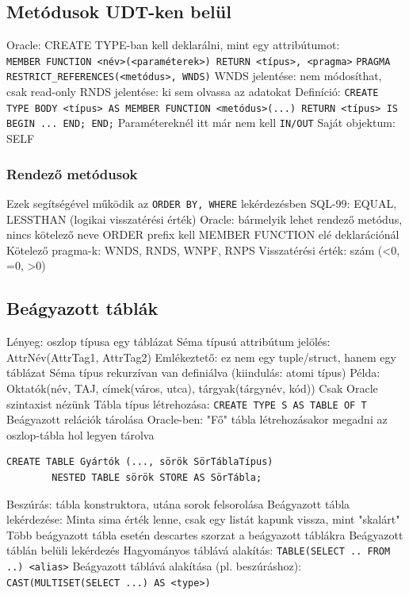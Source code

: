 \documentclass[12pt,a4paper]{article}
\begin{document}
\pagebreak

\subsection{Metódusok UDT-ken belül}

\begin{outline}
	\1 Oracle:
		\2 CREATE TYPE-ban kell deklarálni, mint egy attribútumot:\\
		\texttt{MEMBER FUNCTION <név>(<paraméterek>) RETURN <típus>, <pragma>}
		\2 \texttt{PRAGMA RESTRICT\_REFERENCES(<metódus>, WNDS)}
			\3 WNDS jelentése: nem módosíthat, csak read-only
			\3 RNDS jelentése: ki sem olvassa az adatokat
		\2 Definíció: \texttt{CREATE TYPE BODY <típus> AS MEMBER FUNCTION <metódus>(...) RETURN <típus> IS BEGIN ... END; END;}
			\3 Paramétereknél itt már nem kell \texttt{IN/OUT}
		\2 Saját objektum: SELF
\end{outline}

\subsubsection{Rendező metódusok}

\begin{outline}
	\1 Ezek segítségével működik az \texttt{ORDER BY, WHERE} lekérdezésben
	\1 SQL-99: EQUAL, LESSTHAN (logikai visszatérési érték)
	\1 Oracle: bármelyik lehet rendező metódus, nincs kötelező neve
		\2 ORDER prefix kell MEMBER FUNCTION elé deklarációnál
		\2 Kötelező pragma-k: WNDS, RNDS, WNPF, RNPS
		\2 Visszatérési érték: szám (<0, =0, >0)
\end{outline}

\pagebreak

\subsection{Beágyazott táblák}

\begin{outline}
	\1 Lényeg: oszlop típusa egy táblázat
	\1 Séma típusú attribútum jelölés: AttrNév(AttrTag1, AttrTag2)
		\2 Emlékeztető: ez nem egy tuple/struct, hanem egy táblázat
	\1 Séma típus rekurzívan van definiálva (kiindulás: atomi típus)
	\1 Példa: Oktatók(név, TAJ, címek(város, utca), tárgyak(tárgynév, kód))
	\1 Csak Oracle szintaxist nézünk
	\1 Tábla típus létrehozása: \texttt{CREATE TYPE S AS TABLE OF T}
	\1 Beágyazott relációk tárolása Oracle-ben:
		\2 "Fő" tábla létrehozásakor megadni az oszlop-tábla hol legyen tárolva
		\2 \begin{verbatim}CREATE TABLE Gyártók (..., sörök SörTáblaTípus)
		NESTED TABLE sörök STORE AS SörTábla;\end{verbatim}
	\1 Beszúrás: tábla konstruktora, utána sorok felsorolása
	\1 Beágyazott tábla lekérdezése:
		\2 Minta sima érték lenne, csak egy listát kapunk vissza, mint "skalárt"
		\2 Több beágyazott tábla esetén descartes szorzat a beágyazott táblákra
	\1 Beágyazott táblán belüli lekérdezés
		\2 Hagyományos táblává alakítás: \texttt{TABLE(SELECT .. FROM ..) <alias>}
	\1 Beágyazott táblává alakítása (pl. beszúráshoz):\\
	\texttt{CAST(MULTISET(SELECT ...) AS <type>)}
\end{outline}
\end{document}
